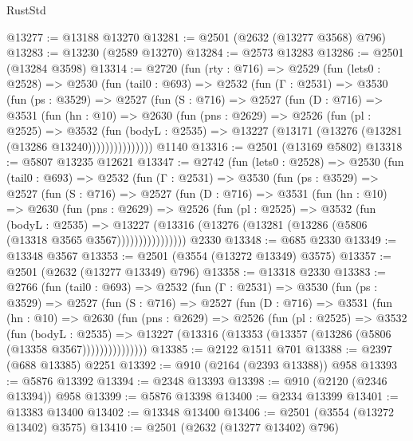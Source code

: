 \begin{lexlean}{RustStd}
\begin{coremodule}
@13277 := @13188 @13270
@13281 := @2501 (@2632 (@13277 @3568) @796)
@13283 := @13230 (@2589 @13270)
@13284 := @2573 @13283
@13286 := @2501 (@13284 @3598)
@13314 := @2720
    (fun (rty : @716) =>
    @2529
      (fun (lets0 : @2528) =>
      @2530
        (fun (tail0 : @693) =>
        @2532
          (fun (Γ : @2531) =>
          @3530
            (fun (ps : @3529) =>
            @2527
              (fun (S : @716) =>
              @2527
                (fun (D : @716) =>
                @3531
                  (fun (hn : @10) =>
                  @2630
                    (fun (pns : @2629) =>
                    @2526
                      (fun (pl : @2525) =>
                      @3532
                        (fun (bodyL : @2535) =>
                        @13227 (@13171 (@13276 (@13281 (@13286 @13240)))))))))))))))
    @1140
@13316 := @2501 (@13169 @5802)
@13318 := @5807 @13235 @12621
@13347 := @2742
    (fun (lets0 : @2528) =>
    @2530
      (fun (tail0 : @693) =>
      @2532
        (fun (Γ : @2531) =>
        @3530
          (fun (ps : @3529) =>
          @2527
            (fun (S : @716) =>
            @2527
              (fun (D : @716) =>
              @3531
                (fun (hn : @10) =>
                @2630
                  (fun (pns : @2629) =>
                  @2526
                    (fun (pl : @2525) =>
                    @3532
                      (fun (bodyL : @2535) =>
                      @13227
                        (@13316 (@13276 (@13281 (@13286 (@5806 (@13318 @3565 @3567))))))))))))))))
    @2330
@13348 := @685 @2330
@13349 := @13348 @3567
@13353 := @2501 (@3554 (@13272 @13349) @3575)
@13357 := @2501 (@2632 (@13277 @13349) @796)
@13358 := @13318 @2330
@13383 := @2766
    (fun (tail0 : @693) =>
    @2532
      (fun (Γ : @2531) =>
      @3530
        (fun (ps : @3529) =>
        @2527
          (fun (S : @716) =>
          @2527
            (fun (D : @716) =>
            @3531
              (fun (hn : @10) =>
              @2630
                (fun (pns : @2629) =>
                @2526
                  (fun (pl : @2525) =>
                  @3532
                    (fun (bodyL : @2535) =>
                    @13227 (@13316 (@13353 (@13357 (@13286 (@5806 (@13358 @3567)))))))))))))))
@13385 := @2122 @1511 @701
@13388 := @2397 (@688 @13385) @2251
@13392 := @910 (@2164 (@2393 @13388)) @958
@13393 := @5876 @13392
@13394 := @2348 @13393
@13398 := @910 (@2120 (@2346 @13394)) @958
@13399 := @5876 @13398
@13400 := @2334 @13399
@13401 := @13383 @13400
@13402 := @13348 @13400
@13406 := @2501 (@3554 (@13272 @13402) @3575)
@13410 := @2501 (@2632 (@13277 @13402) @796)

\end{coremodule}
\end{lexlean}
